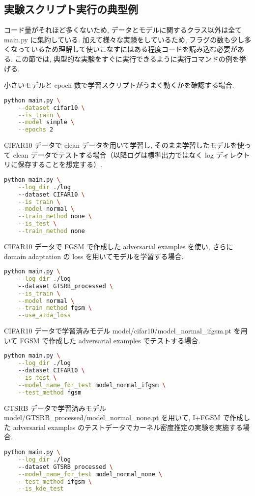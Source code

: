 \subsection{実験スクリプト実行の典型例}
\label{subsec:appendix-exp-script}
コード量がそれほど多くないため, データとモデルに関するクラス以外は全て main.py に集約している.
加えて様々な実験をしているため, フラグの数も少し多くなっているため理解して使いこなすにはある程度コードを読み込む必要がある.
この節では, 典型的な実験をすぐに実行できるように実行コマンドの例を挙げる.

小さいモデルと epoch 数で学習スクリプトがうまく動くかを確認する場合.
%
\begin{lstlisting}[language=bash]
  python main.py \
    --dataset cifar10 \
    --is_train \
    --model simple \
    --epochs 2
\end{lstlisting}
%

CIFAR10 データで clean データを用いて学習し, そのまま学習したモデルを使って clean データでテストする場合（以降ログは標準出力ではなく log ディレクトリに保存することを想定する）.
%
\begin{lstlisting}[language=bash]
  python main.py \
    --log_dir ./log
    --dataset CIFAR10 \
    --is_train \
    --model normal \
    --train_method none \
    --is_test \
    --train_method none
\end{lstlisting}
%

CIFAR10 データで FGSM で作成した adversarial examples を使い, さらに domain adaptation の loss を用いてモデルを学習する場合.
%
\begin{lstlisting}[language=bash]
  python main.py \
    --log_dir ./log
    --dataset GTSRB_processed \
    --is_train \
    --model normal \
    --train_method fgsm \
    --use_atda_loss
\end{lstlisting}
%

CIFAR10 データで学習済みモデル model/cifar10/model\_normal\_ifgsm.pt を用いて FGSM で作成した adversarial examples でテストする場合.
%
\begin{lstlisting}[language=bash]
  python main.py \
    --log_dir ./log
    --dataset CIFAR10 \
    --is_test \
    --model_name_for_test model_normal_ifgsm \
    --test_method fgsm
\end{lstlisting}
%

GTSRB データで学習済みモデル model/GTSRB\_processed/model\_normal\_none.pt を用いて, I+FGSM で作成した adversarial examples のテストデータでカーネル密度推定の実験を実施する場合.
%
\begin{lstlisting}[language=bash]
  python main.py \
    --log_dir ./log
    --dataset GTSRB_processed \
    --model_name_for_test model_normal_none \
    --test_method ifgsm \
    --is_kde_test
\end{lstlisting}
%
